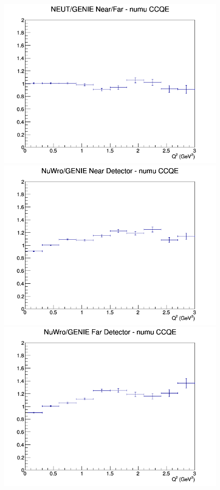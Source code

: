 \begin{figure}[h]
\endminipage
{}
\includegraphics[width=\linewidth]{Q2/nominal/ratios/CCQE_NEUT_GENIE_numu_NF_Q2.png}
\endminipage
\newline
{}
\includegraphics[width=\linewidth]{Q2/nominal/ratios/CCQE_NuWro_GENIE_numu_near_Q2.png}
\endminipage
{}
\includegraphics[width=\linewidth]{Q2/nominal/ratios/CCQE_NuWro_GENIE_numu_far_Q2.png}

\end{figure}
